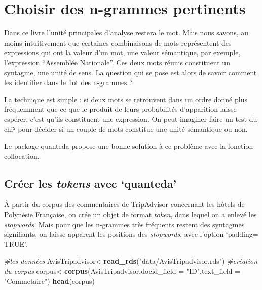 \documentclass[
]{book}
\newenvironment{Shaded}{\begin{snugshade}}{\end{snugshade}}
\newcommand{\CommentTok}[1]{\textcolor[rgb]{0.56,0.35,0.01}{\textit{#1}}}
\newcommand{\DataTypeTok}[1]{\textcolor[rgb]{0.13,0.29,0.53}{#1}}
\newcommand{\KeywordTok}[1]{\textcolor[rgb]{0.13,0.29,0.53}{\textbf{#1}}}
\newcommand{\NormalTok}[1]{#1}
\newcommand{\StringTok}[1]{\textcolor[rgb]{0.31,0.60,0.02}{#1}}
\begin{document}
\hypertarget{choisir-des-n-grammes-pertinents}{%
\section{Choisir des n-grammes pertinents}\label{choisir-des-n-grammes-pertinents}}

Dans ce livre l'unité principales d'analyse restera le mot. Mais nous savons, au moins intuitivement que certaines combinaisons de mots représentent des expressions qui ont la valeur d'un mot, une valeur sémantique, par exemple, l'expression ``Assemblée Nationale''. Ces deux mots réunis constituent un syntagme, une unité de sens. La question qui se pose est alors de savoir comment les identifier dans le flot des n-grammes ?

La technique est simple : si deux mots se retrouvent dans un ordre donné plus fréquemment que ce que le produit de leurs probabilités d'apparition laisse espérer, c'est qu'ils constituent une expression. On peut imaginer faire un test du chi² pour décider si un couple de mots constitue une unité sémantique ou non.

Le package quanteda propose une bonne solution à ce problème avec la fonction collocation.

\hypertarget{cruxe9er-les-tokens-avec-quanteda}{%
\subsection{\texorpdfstring{Créer les \emph{tokens} avec `quanteda'}{Créer les tokens avec `quanteda'}}\label{cruxe9er-les-tokens-avec-quanteda}}

À partir du corpus des commentaires de TripAdvisor concernant les hôtels de Polynésie Française, on crée un objet de format \emph{token}, dans lequel on a enlevé les \emph{stopwords}. Mais pour que les n-grammes très fréquents restent des syntagmes signifiants, on laisse apparent les positions des \emph{stopwords}, avec l'option `padding= TRUE'.

\begin{Shaded}
\begin{Highlighting}[]
\CommentTok{#les données}
\NormalTok{AvisTripadvisor<-}\KeywordTok{read_rds}\NormalTok{(}\StringTok{"data/AvisTripadvisor.rds"}\NormalTok{)}
\CommentTok{#création du corpus}
\NormalTok{corpus<-}\KeywordTok{corpus}\NormalTok{(AvisTripadvisor,}\DataTypeTok{docid_field =} \StringTok{"ID"}\NormalTok{,}\DataTypeTok{text_field =} \StringTok{"Commetaire"}\NormalTok{)}
\KeywordTok{head}\NormalTok{(corpus)}
\end{Highlighting}
\end{Shaded}
\end{document}
